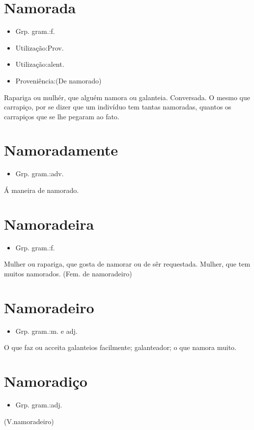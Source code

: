 \section{Namorada}
\begin{itemize}
\item {Grp. gram.:f.}
\end{itemize}
\begin{itemize}
\item {Utilização:Prov.}
\end{itemize}
\begin{itemize}
\item {Utilização:alent.}
\end{itemize}
\begin{itemize}
\item {Proveniência:(De \textunderscore namorado\textunderscore )}
\end{itemize}
Rapariga ou mulhér, que alguém namora ou galanteia.
Conversada.
O mesmo que \textunderscore carrapiço\textunderscore , por se dizer que um indivíduo tem tantas namoradas, quantos os carrapiços que se lhe pegaram ao fato.
\section{Namoradamente}
\begin{itemize}
\item {Grp. gram.:adv.}
\end{itemize}
Á maneira de namorado.
\section{Namoradeira}
\begin{itemize}
\item {Grp. gram.:f.}
\end{itemize}
Mulher ou rapariga, que gosta de namorar ou de sêr requestada.
Mulher, que tem muitos namorados.
(Fem. de \textunderscore namoradeiro\textunderscore )
\section{Namoradeiro}
\begin{itemize}
\item {Grp. gram.:m. e adj.}
\end{itemize}
O que faz ou acceita galanteios facilmente; galanteador; o que namora muito.
\section{Namoradiço}
\begin{itemize}
\item {Grp. gram.:adj.}
\end{itemize}
(V.namoradeiro)
